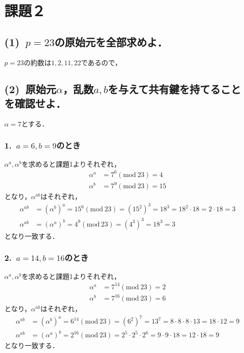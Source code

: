 \documentclass[a4paper,12pt]{jarticle}
\begin{document}
\section*{課題２}
\vspace{-3mm}
\subsection*{(1)~$p=23$の原始元を全部求めよ．}
\vspace{-3mm}
$p=23$の約数は$1,2,11,22$であるので，
\vspace{-6mm}
\subsection*{(2)~原始元$\alpha$，乱数$a,b$を与えて共有鍵を持てることを確認せよ．}
\vspace{-3mm}
$\alpha=7$とする．
\vspace{-6mm}
\subsubsection*{1.~$a=6,b=9$のとき}
\vspace{-4mm}
$\alpha^a,\alpha^b$を求めると課題1よりそれぞれ，
%
\begin{align}
 \alpha^a&=7^6(\mathrm{mod}~23)=4 \\
 \alpha^b&=7^9(\mathrm{mod}~23)=15
\end{align}
%
となり，$\alpha^{ab}$はそれぞれ，
%
\begin{align}
 \alpha^{ab}&=(\alpha^b)^a=15^6(\mathrm{mod}~23)=(15^2)^3=18^3=18^2\cdot18=2\cdot18=3\\
 \alpha^{ab}&=(\alpha^a)^b=4^9(\mathrm{mod}~23)=(4^3)^3=18^3=3
\end{align}
%
となり一致する．
\vspace{-6mm}
\subsubsection*{2.~$a=14,b=16$のとき}
\vspace{-4mm}
$\alpha^a,\alpha^b$を求めると課題1よりそれぞれ，
%
\begin{align}
 \alpha^a&=7^{14}(\mathrm{mod}~23)=2 \\
 \alpha^b&=7^{16}(\mathrm{mod}~23)=6
\end{align}
%
となり，$\alpha^{ab}$はそれぞれ，
%
\begin{align}
 \alpha^{ab}&=(\alpha^b)^a=6^{14}(\mathrm{mod}~23)=(6^2)^7=13^7=8\cdot8\cdot8\cdot13=18\cdot12=9\\
 \alpha^{ab}&=(\alpha^a)^b=2^{16}(\mathrm{mod}~23)=2^5\cdot2^5\cdot2^6=9\cdot9\cdot18=12\cdot18=9
\end{align}
%
となり一致する．
\vspace{-6mm}
\end{document}
